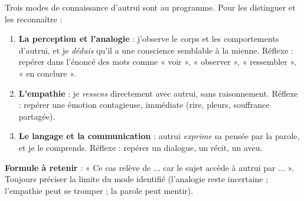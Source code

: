 \documentclass[11pt]{article}
\begin{document}
\begin{methode}
Trois modes de connaissance d'autrui sont au programme. Pour les distinguer et les reconnaître :
\begin{enumerate}
\item \textbf{La perception et l'analogie} : j'observe le corps et les comportements d'autrui, et je \emph{déduis} qu'il a une conscience semblable à la mienne. Réflexe : repérer dans l'énoncé des mots comme « voir », « observer », « ressembler », « en conclure ».
\item \textbf{L'empathie} : je \emph{ressens} directement avec autrui, sans raisonnement. Réflexe : repérer une émotion contagieuse, immédiate (rire, pleurs, souffrance partagée).
\item \textbf{Le langage et la communication} : autrui \emph{exprime} sa pensée par la parole, et je le comprends. Réflexe : repérer un dialogue, un récit, un aveu.
\end{enumerate}
\textbf{Formule à retenir} : « Ce cas relève de ... car le sujet accède à autrui par ... ». Toujours préciser la limite du mode identifié (l'analogie reste incertaine ; l'empathie peut se tromper ; la parole peut mentir).
\end{methode}
\end{document}
